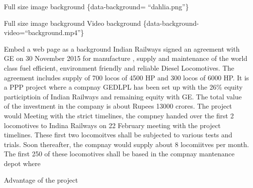 \documentclass[
  ignorenonframetext,
]{beamer}
\begin{document}
\begin{frame}{Full size image background \{data-background=
``dahlia.png''\}}
\protect\hypertarget{full-size-image-background-data-background-dahlia.png}{}
\begin{block}{Full size image background}
\protect\hypertarget{full-size-image-background}{}
Video background \{data-background-video=``background.mp4''\}
\end{block}
\end{frame}

\begin{frame}{Embed a web page as a background}
\protect\hypertarget{embed-a-web-page-as-a-background}{}
Indian Railways signed an agreement with GE on 30 November 2015 for
manufacture , supply and maintenance of the world class fuel efficient,
environment friendly and reliable Diesel Locomotives. The agreement
includes supply of 700 locos of 4500 HP and 300 locos of 6000 HP. It is
a PPP project where a compnay GEDLPL has been set up with the 26\%
equity participtioin of Indian Railways and remaining equity with GE.
The total value of the investment in the company is about Rupees 13000
crores. The project would Meeting with the strict timelines, the compney
handed over the first 2 locomotives to Indina Railways on 22 February
meeting with the project timelines. These first two locomoitves shall be
subjected to various tests and trials. Soon thereafter, the compnay
would supply about 8 locomiitves per month. The first 250 of these
locomotives shall be based in the compnay mantenance depot where
\end{frame}

\begin{frame}{Advantage of the project}
\protect\hypertarget{advantage-of-the-project}{}
\end{frame}
\end{document}
